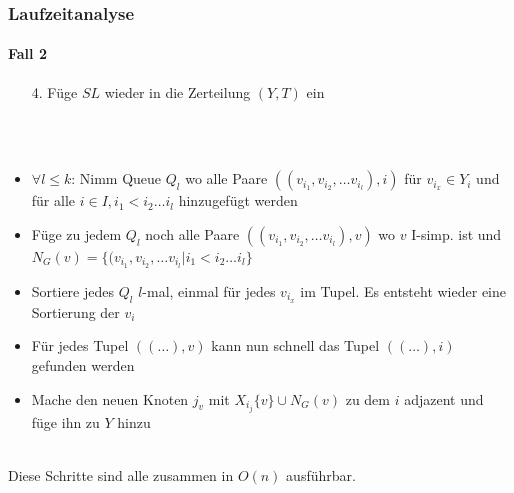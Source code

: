 \begin{frame}
\frametitle{Laufzeitanalyse}
\framesubtitle{Fall 2}

\begin{enumerate}
	\item[4.] Füge $SL$ wieder in die Zerteilung $(Y,T)$ ein
\end{enumerate}
\ \\
\ \\

\begin{itemize}
	\item $\forall l \leq k$: Nimm Queue $Q_l$ wo alle Paare $((v_{i_1}, v_{i_2}, \dots v_{i_l}), i)$ für $v_{i_x} \in Y_i$ und für alle $i \in I, i_1 < i_2 \dots i_l$ hinzugefügt werden
	\item Füge zu jedem $Q_l$ noch alle Paare $((v_{i_1}, v_{i_2}, \dots v_{i_l}), v)$ wo $v$ I-simp. ist und $N_G(v) = \{ (v_{i_1}, v_{i_2}, \dots v_{i_l} | i_1 < i_2 \dots i_l \}$
	\item Sortiere jedes $Q_l$ $l$-mal, einmal für jedes $v_{i_x}$ im Tupel. Es entsteht wieder eine Sortierung der $v_i$
	\item Für jedes Tupel $((\dots), v)$ kann nun schnell das Tupel $((\dots), i)$ gefunden werden
	\item Mache den neuen Knoten $j_v$ mit $X_{i_j} \{ v \} \cup N_G(v)$ zu dem $i$ adjazent und füge ihn zu $Y$ hinzu
\end{itemize}
\ \\
Diese Schritte sind alle zusammen in $O(n)$ ausführbar.
\end{frame}
